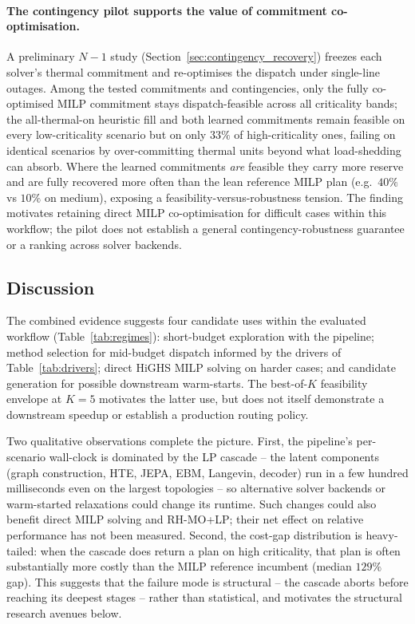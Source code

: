 \documentclass{article}
\begin{document}
\paragraph{The contingency pilot supports the value of commitment co-optimisation.}
A preliminary $N{-}1$ study (Section~\ref{sec:contingency_recovery}) freezes each solver's thermal commitment and re-optimises the dispatch under single-line outages. Among the tested commitments and contingencies, only the fully co-optimised MILP commitment stays dispatch-feasible across all criticality bands; the all-thermal-on heuristic fill and both learned commitments remain feasible on every low-criticality scenario but on only $33\%$ of high-criticality ones, failing on identical scenarios by over-committing thermal units beyond what load-shedding can absorb. Where the learned commitments \emph{are} feasible they carry more reserve and are fully recovered more often than the lean reference MILP plan (e.g.\ $40\%$ vs $10\%$ on medium), exposing a feasibility-versus-robustness tension. The finding motivates retaining direct MILP co-optimisation for difficult cases within this workflow; the pilot does not establish a general contingency-robustness guarantee or a ranking across solver backends.

\subsection{Discussion}
\label{sec:discussion}

The combined evidence suggests four candidate uses within the evaluated workflow (Table~\ref{tab:regimes}): short-budget exploration with the pipeline; method selection for mid-budget dispatch informed by the drivers of Table~\ref{tab:drivers}; direct HiGHS MILP solving on harder cases; and candidate generation for possible downstream warm-starts. The best-of-$K$ feasibility envelope at $K=5$ motivates the latter use, but does not itself demonstrate a downstream speedup or establish a production routing policy.

Two qualitative observations complete the picture. First, the pipeline's per-scenario wall-clock is dominated by the LP cascade -- the latent components (graph construction, HTE, JEPA, EBM, Langevin, decoder) run in a few hundred milliseconds even on the largest topologies -- so alternative solver backends or warm-started relaxations could change its runtime. Such changes could also benefit direct MILP solving and RH-MO+LP; their net effect on relative performance has not been measured. Second, the cost-gap distribution is heavy-tailed: when the cascade does return a plan on high criticality, that plan is often substantially more costly than the MILP reference incumbent (median $129\%$ gap). This suggests that the failure mode is structural -- the cascade aborts before reaching its deepest stages -- rather than statistical, and motivates the structural research avenues below.
\end{document}
